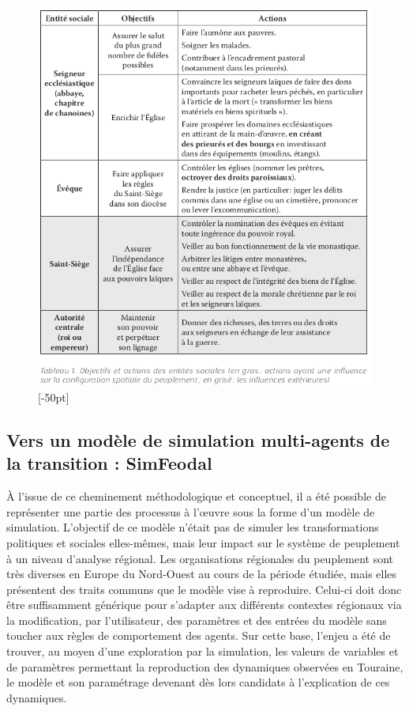 \documentclass[12pt, a4paper, oneside]{book}
\begin{document}
	\begin{figure}[H]
	\centering
	\includegraphics[width=1\linewidth]{src/Chapitre_TMD/Tab1_2.png}
	[-50pt]
	\end{figure}
	
	\subsection{Vers un modèle de simulation multi-agents de la transition : SimFeodal}
	
	À l'issue de ce cheminement méthodologique et conceptuel, il a été possible de représenter une partie des processus à l'œuvre sous la forme d'un modèle de simulation.
	L'objectif de ce modèle n'était pas de simuler les transformations politiques et sociales elles-mêmes, mais leur impact sur le système	de peuplement à un niveau d'analyse régional.
	Les organisations régionales du peuplement sont très diverses en Europe du Nord-Ouest au cours de la période étudiée, mais elles présentent des traits communs que le modèle vise à reproduire.
	Celui-ci doit donc être suffisamment générique pour s'adapter aux différents contextes régionaux via la modification, par l'utilisateur, des paramètres et des entrées du modèle sans toucher aux règles de comportement des agents.
	Sur cette base, l'enjeu a été de trouver, au moyen d'une exploration par la simulation, les valeurs de variables et de paramètres permettant la reproduction des dynamiques observées en Touraine, le modèle et son paramétrage	devenant dès lors candidats à l'explication de ces dynamiques.
	
\end{document}

